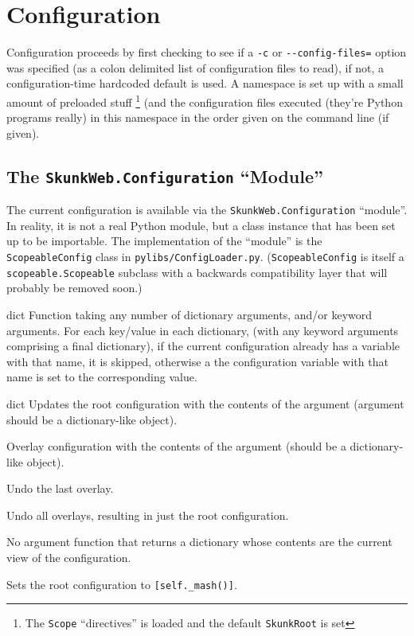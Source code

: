 \documentclass{manual}
\begin{document}
\section{Configuration}
Configuration proceeds by first checking to see if a \verb!-c! or
\verb!--config-files=! option was specified (as a colon delimited list
of configuration files to read), if not, a configuration-time
hardcoded default is used.  A namespace is set up with a small amount
of preloaded stuff \footnote{The \texttt{Scope} ``directives'' is loaded and the default \texttt{SkunkRoot} is set}
(and the configuration files executed (they're
Python programs really) in this namespace in the order given on the
command line (if given).

\subsection{The \texttt{SkunkWeb.Configuration} ``Module''}

The current configuration is available via the
\texttt{SkunkWeb.Configuration} ``module''.  In reality, it is not a
real Python module, but a class instance that has been set up to be
importable.  The implementation of the ``module'' is the
\texttt{ScopeableConfig} class in  \verb!pylibs/ConfigLoader.py!.
(\texttt{ScopeableConfig} is itself a \texttt{scopeable.Scopeable} subclass
with a backwards compatibility layer that will probably be removed soon.)

\begin{methoddesc}{\mergeDefaults}{dict} Function taking any number of dictionary
arguments, and/or keyword arguments. For each key/value in each dictionary, (with 
any keyword arguments comprising a final dictionary), if the current
configuration already has a variable with that name, it is skipped,
otherwise a the configuration variable with that name is set to the
corresponding value. 
\end{methoddesc}

\begin{methoddesc}{\update}{dict} Updates the root configuration with the
contents of the argument (argument should be a dictionary-like
object). 
\end{methoddesc}
\begin{methoddesc}{\push}{} Overlay configuration with the contents
of the argument (should be a dictionary-like object). 
\end{methoddesc}
\begin{methoddesc}{\pop}{} Undo the last overlay.
\end{methoddesc}
\begin{methoddesc}{\trim}{} Undo all overlays, resulting in just the
root configuration. 
\end{methoddesc}
\begin{methoddesc}{\mash}{} No argument function that returns a
dictionary whose contents are the current view of the configuration.
\end{methoddesc}
\begin{methoddesc}{\mashSelf}{} Sets the root configuration to
\verb![self._mash()]!. 
\end{methoddesc}
\end{document}
